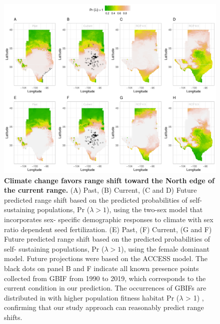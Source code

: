 \documentclass[12pt]{article}\usepackage[]{graphicx}\usepackage[dvipsnames]{xcolor}
\begin{document}
\begin{figure}[H]
  \begin{center}
    \includegraphics[width=0.99\linewidth]{Figures/Fig_geoPrlambdaacc.pdf}
  \caption{ \textbf{Climate change favors range shift toward the North edge of the current range.}
  (A) Past, (B) Current, (C and D) Future predicted range shift based on the predicted probabilities of self- sustaining populations, Pr ($\lambda > 1$), using the two-sex model that incorporates sex- specific demographic responses to climate with sex ratio dependent seed fertilization.
  (E) Past, (F) Current, (G and F) Future  predicted range shift based on the predicted probabilities of self- sustaining populations, Pr ($\lambda > 1$), using the female dominant model.
  Future projections were based on the ACCESS model.
  The black dots on panel B and F indicate all known presence points collected from GBIF from 1990 to 2019, which corresponds to the current condition in our prediction. 
  The occurrences of GBIFs are distributed in with higher population fitness habitat Pr ($\lambda$ > 1) , confirming that our study approach can reasonably predict range shifts. }
  \label{fig:geoprojacc}
  \end{center}
\end{figure}
\end{document}
